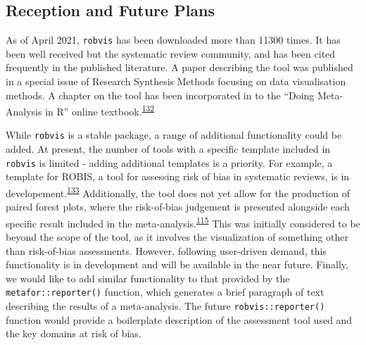 \documentclass[a4paper, twoside]{templates/ociamthesis}
\newcommand*{\bibtitle}{Bibliography}
\begin{document}
\hypertarget{reception-and-future-plans-1}{%
\subsection{Reception and Future Plans}\label{reception-and-future-plans-1}}

As of April 2021, \texttt{robvis} has been downloaded more than 11300 times. It has been well received but the systematic review community, and has been cited frequently in the published literature. A paper describing the tool was published in a special issue of Research Synthesis Methods focusing on data visualisation methods. A chapter on the tool has been incorporated in to the ``Doing Meta-Analysis in R'' online textbook.\textsuperscript{\protect\hyperlink{ref-mathias_harrer_2019_2551803}{132}}

While \texttt{robvis} is a stable package, a range of additional functionality could be added. At present, the number of tools with a specific template included in \texttt{robvis} is limited - adding additional templates is a priority. For example, a template for ROBIS, a tool for assessing risk of bias in systematic reviews, is in developement.\textsuperscript{\protect\hyperlink{ref-whiting2016robis}{133}} Additionally, the tool does not yet allow for the production of paired forest plots, where the risk-of-bias judgement is presented alongside each specific result included in the meta-analysis.\textsuperscript{\protect\hyperlink{ref-cochranechpt7}{115}} This was initially considered to be beyond the scope of the tool, as it involves the visualization of something other than risk-of-bias assessments. However, following user-driven demand, this functionality is in development and will be available in the near future. Finally, we would like to add similar functionality to that provided by the \texttt{metafor::reporter()} function, which generates a brief paragraph of text describing the results of a meta-analysis. The future \texttt{robvis::reporter()} function would provide a boilerplate description of the assessment tool used and the key domains at risk of bias.


\setlength{\baselineskip}{0pt} %

{\renewcommand*\MakeUppercase[1]{#1}%
\printbibliography[heading=bibintoc,title={\bibtitle}]}
\end{document}
